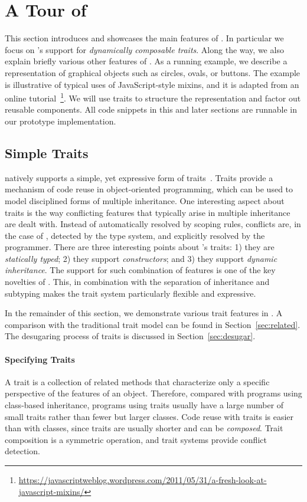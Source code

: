 \section{A Tour of \name}
\label{sec:traits}

This section introduces and showcases the main features of \name. In particular
we focus on \name's support for \textit{dynamically composable traits}.
Along the way, we also explain briefly various other features of \name.
As a running example, we describe a representation of graphical objects such as
circles, ovals, or buttons. The example is illustrative of typical uses of
JavaScript-style mixins, and it is adapted from an online
tutorial~\footnote{\url{https://javascriptweblog.wordpress.com/2011/05/31/a-fresh-look-at-javascript-mixins/}}.
We will use traits to structure the representation and factor out reusable
components. All code snippets in this and later sections are runnable in our
prototype implementation.


\subsection{Simple Traits}

\name natively supports a simple, yet expressive form of
traits~\cite{scharli2003traits}. Traits provide a mechanism of code reuse in
object-oriented programming, which can be used to model disciplined forms of
multiple inheritance. One interesting aspect about traits is the way conflicting
features that typically arise in multiple inheritance are dealt with. Instead of
automatically resolved by scoping rules, conflicts are, in the case of \name,
detected by the type system, and explicitly resolved by the programmer.
There are three interesting points about \name's traits: 1) they are
\emph{statically typed}; 2) they support \emph{constructors}; and 3)
they support \emph{dynamic inheritance}. The support for such
combination of features is one of the key novelties of \name. This, in
combination with the separation of inheritance and subtyping makes the
trait system particularly flexible and expressive.

In the remainder of this section, we demonstrate various trait features in
\name. A comparison with the traditional trait model can be found in
Section~\ref{sec:related}. The desugaring process of traits is
discussed in Section~\ref{sec:desugar}.

\paragraph{Specifying Traits}
A trait is a collection of related methods that characterize only
a specific perspective of the features of an object. Therefore, compared with
programs using class-based inheritance, programs using traits usually have a large number of
small traits rather than fewer but larger classes. Code reuse with traits is
easier than with classes, since traits are usually shorter and can be
\textit{composed}. %
Trait composition is
a symmetric operation, and trait systems provide conflict detection.

